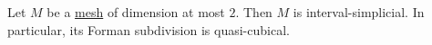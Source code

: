 \begin{proposition}
  Let $M$ be a \hyperref[cmc:mesh:definition]{mesh} of dimension at most $2$.
  Then $M$ is interval-simplicial.
  In particular, its Forman subdivision is quasi-cubical.
\end{proposition}
